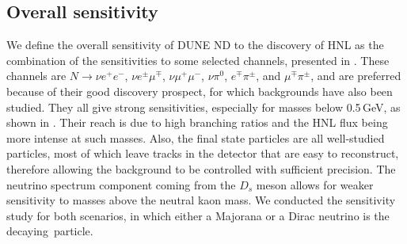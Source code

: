 \subsection{Overall sensitivity}

We define the overall sensitivity of DUNE ND to the discovery of HNL as the combination of the sensitivities %
to some selected channels, presented in .
These channels are $N \to \nu e^+ e^-$, $\nu e^\pm \mu^\mp$, $\nu \mu^+\mu^-$, $\nu\pi^0$, $e^\mp\pi^\pm$, and $\mu^\mp\pi^\pm$, %
and are preferred because of their good discovery prospect, for which backgrounds have also been studied.
They all give strong sensitivities, especially for masses below 0.5\,GeV, as shown in .
Their reach is due to high branching ratios and the HNL flux being more intense at such masses.
Also, the final state particles are all well-studied particles, most of which leave tracks in the detector %
that are easy to reconstruct, therefore allowing the background to be controlled with sufficient precision.
The neutrino spectrum component coming from the $D_s$ meson allows for weaker sensitivity %
to masses above the neutral kaon mass.
We conducted the sensitivity study for both scenarios, in which either a Majorana or a Dirac neutrino is the decaying~particle.



